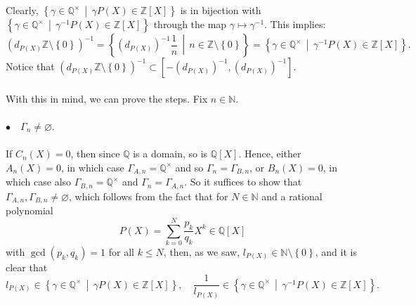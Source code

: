 \begin{solution}
    \\\\
    Clearly, \( \left\{ \gamma \in \mathbb{Q}^{\times} \,\middle|\, \gamma P\left(X\right) \in \mathbb{Z}\left[X\right] \right\} \) is in bijection with \( \left\{ \gamma \in \mathbb{Q}^{\times} \,\middle|\, \gamma^{-1} P\left(X\right) \in \mathbb{Z}\left[X\right] \right\} \) through the map \( \gamma \mapsto \gamma^{-1} \). This implies:
    \begin{equation}
        \tag{2} \label{5.2} \left(d_{P\left(X\right)} \mathbb{Z} \setminus \left\{ 0 \right\}\right)^{-1} = \left\{\left(d_{P\left(X\right)}\right)^{-1}\frac{1}{n} \,\middle|\, n \in \mathbb{Z} \setminus \left\{ 0 \right\} \right\} = \left\{ \gamma \in \mathbb{Q}^{\times} \,\middle|\, \gamma^{-1} P\left(X\right) \in \mathbb{Z}\left[X\right] \right\}.
    \end{equation}
    Notice that \( \left(d_{P\left(X\right)} \mathbb{Z} \setminus \left\{ 0 \right\}\right)^{-1} \subset \left[-\left(d_{P\left(X\right)}\right)^{-1}, \left(d_{P\left(X\right)}\right)^{-1}\right] \).
    \\\\
    With this in mind, we can prove the steps. Fix \( n \in \mathbb{N} \).
    \\\\
    \( \bullet\quad \Gamma_n \neq \varnothing \).
    \\\\
    If \( C_n\left(X\right) = 0 \), then since \( \mathbb{Q} \) is a domain, so is \( \mathbb{Q}\left[X\right] \). Hence, either \( A_n\left(X\right) = 0 \), in which case \( \Gamma_{A,n} = \mathbb{Q}^{\times} \) and so \( \Gamma_n = \Gamma_{B,n} \), or \( B_n\left(X\right) = 0 \), in which case also \( \Gamma_{B,n} = \mathbb{Q}^{\times} \) and \( \Gamma_n = \Gamma_{A,n} \). So it suffices to show that \( \Gamma_{A,n}, \Gamma_{B,n} \neq \varnothing \), which follows from the fact that for \( N \in \mathbb{N} \) and a rational polynomial
    \[
        P\left(X\right) = \sum_{k=0}^{N} \frac{p_k}{q_k} X^{k} \in \mathbb{Q}\left[X\right]
    \]
    with \( \gcd\left(p_k, q_k\right) = 1 \) for all \( k \leq N \), then, as we saw, \( l_{P\left(X\right)} \in \mathbb{N} \setminus \left\{ 0 \right\} \), and it is clear that
    \[
        l_{P\left(X\right)} \in \left\{ \gamma \in \mathbb{Q}^{\times} \,\middle|\, \gamma P\left(X\right) \in \mathbb{Z}\left[X\right] \right\}, \quad \frac{1}{l_{P\left(X\right)}} \in \left\{ \gamma \in \mathbb{Q}^{\times} \,\middle|\, \gamma^{-1} P\left(X\right) \in \mathbb{Z}\left[X\right] \right\}.
\]
\end{solution}
